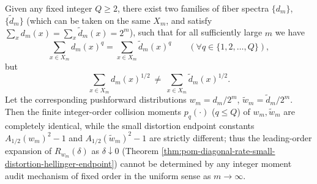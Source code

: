 \begin{theorem}[Finite Integer Collision Moments Cannot Replace \texorpdfstring{$q=\tfrac12$}{q=1/2} Endpoint Constant]\label{thm:pom-finite-integer-moments-cannot-replace-half}
Given any fixed integer \(Q\ge 2\), there exist two families of fiber spectra \(\{d_m\}\), \(\{\widetilde d_m\}\) (which can be taken on the same \(X_m\), and satisfy \(\sum_x d_m(x)=\sum_x \widetilde d_m(x)=2^m\)), such that for all sufficiently large \(m\) we have
\[
\sum_{x\in X_m} d_m(x)^q=\sum_{x\in X_m}\widetilde d_m(x)^q\qquad(\forall q\in\{1,2,\dots,Q\}),
\]
but
\[
\sum_{x\in X_m} d_m(x)^{1/2}\ \ne\ \sum_{x\in X_m}\widetilde d_m(x)^{1/2}.
\]
Let the corresponding pushforward distributions \(w_m=d_m/2^m\), \(\widetilde w_m=\widetilde d_m/2^m\).
Then the finite integer-order collision moments \(p_q(\cdot)\) (\(q\le Q\)) of \(w_m,\widetilde w_m\) are completely identical, while the small distortion endpoint constants \(A_{1/2}(w_m)^2-1\) and \(A_{1/2}(\widetilde w_m)^2-1\) are strictly different;
thus the leading-order expansion of \(R_{w_m}(\delta)\) as \(\delta\downarrow 0\) (Theorem \ref{thm:pom-diagonal-rate-small-distortion-hellinger-endpoint}) cannot be determined by any integer moment audit mechanism of fixed order in the uniform sense as \(m\to\infty\).
\end{theorem}
